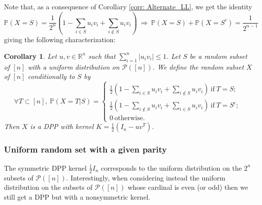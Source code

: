\documentclass{article}
\numberwithin{equation}{section}
\renewcommand{\leq}{\leqslant}
\newcommand{\bR}{\mathbb{R}}
\newcommand{\cP}{\mathcal{P}}
\theoremstyle{plain}
\newtheorem{corollary}[proposition]{Corollary}
\begin{document}
\noindent Note that, as a consequence of Corollary \ref{corr: Alternate_LL}, we get the identity
\[\mathbb{P}(X=S)=\frac{1}{2^n}\left(1-\sum_{i\in S}u_iv_i+\sum_{i\not\in S}u_iv_i\right)~\Rightarrow~\mathbb{P}(X=S)+\mathbb{P}(X=S^c)=\frac{1}{2^{n-1}}\]
giving the following characterization:

\begin{corollary}\label{prop: Simu_half_identity_rank_1}
Let $u,v\in\bR^n$ such that $\sum_{i=1}^n|u_iv_i|\leq 1$. Let $S$ be a random subset of $[n]$ with a uniform distribution on $\mathcal{P}([n])$. We define the random subset $X$ of $[n]$ conditionally to $S$ by
\[\forall T\subset [n],~\mathbb{P}(X=T|S)=\left\{\begin{array}{l}
\frac{1}{2}\left(1-\sum_{i\in S}u_iv_i+\sum_{i\not\in S}u_iv_i\right)~\mbox{if}~T=S;\\
\frac{1}{2}\left(1-\sum_{i\not\in S}u_iv_i+\sum_{i\in S}u_iv_i\right)~\mbox{if}~T=S^c;\\
0~\mbox{otherwise.}
\end{array}
\right.\]
Then $X$ is a DPP with kernel $K=\frac{1}{2}(I_n - uv^T)$.
\end{corollary}

\subsubsection*{Uniform random set with a given parity}

The symmetric DPP kernel $\frac{1}{2}I_n$ corresponds to the uniform distribution on the $2^n$ subsets of $\cP([n])$. Interestingly, when considering instead the uniform distribution on the subsets of $\cP([n])$ whose cardinal is even (or odd) then we still get a DPP but with a nonsymmetric kernel.
\end{document}
